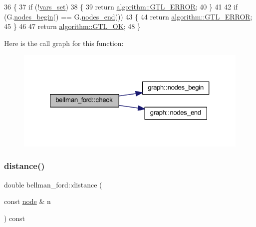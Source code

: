 \begin{DoxyCode}
36 \{
37     \textcolor{keywordflow}{if} (!\mbox{\hyperlink{classbellman__ford_a0b727de83366d019041694f890f19dbb}{vars\_set}}) 
38     \{
39     \textcolor{keywordflow}{return} \mbox{\hyperlink{classalgorithm_af1a0078e153aa99c24f9bdf0d97f6710a6fcf574690bbd6cf710837a169510dd7}{algorithm::GTL\_ERROR}};
40     \}
41 
42     \textcolor{keywordflow}{if} (G.\mbox{\hyperlink{classgraph_aec053a4b509d1be804237a80044c54c0}{nodes\_begin}}() == G.\mbox{\hyperlink{classgraph_abbf9c0cb5629e98e1142254911238173}{nodes\_end}}()) 
43     \{
44     \textcolor{keywordflow}{return} \mbox{\hyperlink{classalgorithm_af1a0078e153aa99c24f9bdf0d97f6710a6fcf574690bbd6cf710837a169510dd7}{algorithm::GTL\_ERROR}};
45     \}
46 
47     \textcolor{keywordflow}{return} \mbox{\hyperlink{classalgorithm_af1a0078e153aa99c24f9bdf0d97f6710a5114c20e4a96a76b5de9f28bf15e282b}{algorithm::GTL\_OK}};
48 \}
\end{DoxyCode}
Here is the call graph for this function\+:\nopagebreak
\begin{figure}[H]
\begin{center}
\leavevmode
\includegraphics[width=321pt]{classbellman__ford_a9da2fb7d20ef1f726ee935474302d80b_cgraph}
\end{center}
\end{figure}
\mbox{\label{classbellman__ford_a881e5b021e69aced997185208438f910}} 
\subsubsection{\texorpdfstring{distance()}{distance()}}
{\footnotesize\ttfamily double bellman\+\_\+ford\+::distance (\begin{DoxyParamCaption}\item[{const \mbox{\hyperlink{classnode}{node}} \&}]{n }\end{DoxyParamCaption}) const\hspace{0.3cm}{\ttfamily [inline]}}



